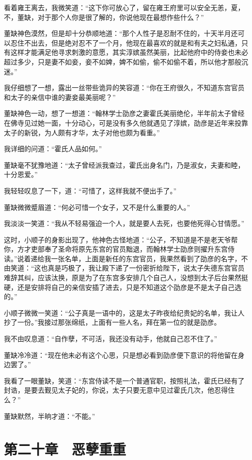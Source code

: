 看着雍王离去，我微笑道：“这下你可放心了，留在雍王府里可以安全无恙，夏，不，董缺，对于那个人你是很了解的，你说他现在最想作些什么？”

董缺神色漠然，但是却十分恭顺地道：“那个人性子是忍耐不住的，十天半月还可以忍住不出去，但是绝对忍不了一个月，他现在最喜欢的就是和有夫之妇私通，只有这样才能满足他寻求刺激的意愿，其实淳嫔虽然美丽，比起他府中的侍妾也未必超过多少，只是妻不如妾，妾不如婢，婢不如偷，偷不如偷不着，所以他才那般沉迷。”

我仔细想了一想，露出一丝带些诡异的笑容道：“你在王府很久，不知道东宫官员和太子的亲信中谁的妻妾最美丽呢？”

董缺神色一动，想了一想道：“翰林学士劭彦之妻霍氏美丽绝伦，半年前太子曾经在佛寺见过她一面，十分动心，可是没有多久他就遇见了淳嫔，劭彦是近年来投靠太子的新锐，为人颇有才华，太子对他也颇为看重。”

我详细的问道：“霍氏人品如何。”

董缺毫不犹豫地道：“太子曾经派我查过，霍氏出身名门，乃是淑女，夫妻和睦，十分恩爱。”

我轻轻叹息了一下，道：“可惜了，这样我就不便出手了。”

董缺微微蹙眉道：“何必可惜一个女子，又不是什么重要的人。”

我淡淡一笑道：“我从不轻易强迫一个人，就是要人去死，也要他死得心甘情愿。”

这时，小顺子的身影出现了，他神色古怪地道：“公子，不知道是不是老天爷帮你，方才吏部奉了圣命将原先东宫的官员黜退，而翰林学士劭彦则擢升东宫侍读。”说着递给我一张名单，上面是新任的东宫官员，我果然看到了劭彦的名字，不由笑道：“这也真是巧极了，我让殿下递了一份密折给陛下，说太子失德东宫官员难辞其纠，应该汰换，原是为了在东宫多安排几个自己人，没想到太子后台果然挺硬，还是安排将自己的亲信安插了进去，只是不知道这个劭彦是不是太子自己选的。”

小顺子微微一笑道：“公子真是一语中的，这是太子昨夜给纪贵妃的名单，我让人抄了一份。”我接过那张绵纸，上面有一些人名，拜在第一位的就是劭彦。

我不由叹息道：“自作孽，不可活，我还没有动手，他就自己忍不住了。”

董缺冷冷道：“现在他未必有这个心思，只是想必看到劭彦便下意识的将他留在身边罢了。”

我看了一眼董缺，笑道：“东宫侍读不是一个普通官职，按照礼法，霍氏已经有了封诰，是要去觐见太子妃的，你说，太子只要无意中见过霍氏几次，他忍得住么？”

董缺默然，半晌才道：“不能。”

\chapter{第二十章　恶孽重重}

